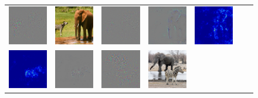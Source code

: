 \begin{figure}
\begin{center}
\begin{tabular}{ccccccc}
\includegraphics[width=0.13\linewidth]{figs/examples/googlenet/oxford/zeb-ele1_diff_341} &
\includegraphics[width=0.13\linewidth]{figs/examples/googlenet/oxford/zeb-ele1} &
\includegraphics[width=0.13\linewidth]{figs/examples/googlenet/oxford/zeb-ele1_diff_387} &
\includegraphics[width=0.13\linewidth]{figs/examples/googlenet/soft/zeb-ele1_diff_387} &
\includegraphics[width=0.13\linewidth]{figs/examples/googlenet/soft/zeb-ele1_sali_387} \\
\includegraphics[width=0.13\linewidth]{figs/examples/googlenet/soft/zeb-ele2_sali_341} &
\includegraphics[width=0.13\linewidth]{figs/examples/googlenet/soft/zeb-ele2_diff_341} &
\includegraphics[width=0.13\linewidth]{figs/examples/googlenet/oxford/zeb-ele2_diff_341} &
\includegraphics[width=0.13\linewidth]{figs/examples/googlenet/oxford/zeb-ele2} &

\end{tabular}
\end{center}
\end{figure}
